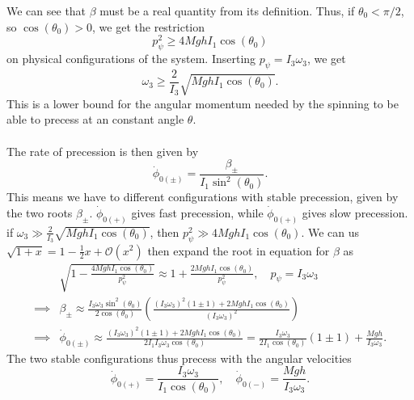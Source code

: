\documentclass{article}
\begin{document}
        We can see that $\beta$ must be a real quantity from its definition. Thus, if $\theta_0 < \pi / 2$, so $\cos(\theta_0) > 0$, we get the restriction
        \begin{equation*}
            p_\psi^2 \geq 4 M g h I_1 \cos(\theta_0)
        \end{equation*}
        on physical configurations of the system. Inserting $p_\psi = I_3 \omega_3$, we get
        \begin{equation*}
            \omega_3 \geq \frac{2}{I_3} \sqrt{MghI_1 \cos(\theta_0)}.
        \end{equation*}
        This is a lower bound for the angular momentum needed by the spinning to be able to precess at an constant angle $\theta$. \\ \\
        The rate of precession is then given by
        \begin{equation*}
            \dot \phi_{0(\pm)} = \frac{\beta_\pm}{I_1 \sin^2(\theta_0)}.
        \end{equation*}
        This means we have to different configurations with stable precession, given by the two roots $\beta_\pm$. $\dot \phi_{0(+)}$ gives fast precession, while $\dot \phi_{0(+)}$ gives slow precession. if $\omega_3 \gg \frac{2}{I_3}\sqrt{MghI_1 \cos(\theta_0) }$, then $p_\psi^2 \gg 4 M g h I_1 \cos(\theta_0)$. We can us $\sqrt{1 + x} = 1 - \frac{1}{2} x + \mathcal{O}(x^2)$ then expand the root in equation for $\beta$ as
        \begin{align*}
            & \sqrt{1 - \frac{4 M g h I_1 \cos(\theta_0)}{p_\psi^2}} \approx 1 +\frac{2 M g h I_1 \cos(\theta_0)}{p_\psi^2}, \quad p_\psi = I_3 \omega_3  \\
            \implies &\beta_\pm \approx \frac{I_3 \omega_3 \sin^2(\theta_0)}{2 \cos(\theta_0)} \left(\frac{ (I_3 \omega_3 )^2 (1\pm 1) + 2 M g h I_1 \cos(\theta_0)}{(I_3 \omega_3)^2} \right) \\
            \implies & \dot \phi_{0(\pm)} \approx \frac{ (I_3 \omega_3 )^2(1\pm 1) + 2 M g h I_1 \cos(\theta_0)}{2 I_1 I_3 \omega_3 \cos(\theta_0)} = \frac{I_3 \omega_3}{2 I_1 \cos(\theta_0)} (1\pm 1) + \frac{Mgh}{I_3 \omega_3}.
        \end{align*}
        The two stable configurations thus precess with the angular velocities
        \begin{equation*}
            \dot \phi_{0(+)} = \frac{I_3 \omega_3}{I_1 \cos(\theta_0)}, \quad \dot \phi_{0(-)} = \frac{Mgh}{I_3 \omega_3}.
        \end{equation*}
\end{document}
